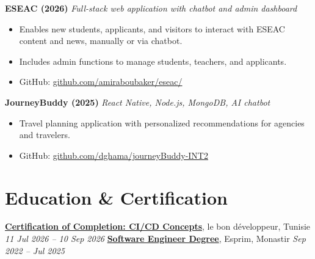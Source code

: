 \documentclass[10pt,a4paper]{article}
\begin{document}
\textbf{ESEAC (2026)} \hfill \textit{Full-stack web application with chatbot and admin dashboard}
\begin{itemize}
  \item Enables new students, applicants, and visitors to interact with ESEAC content and news, manually or via chatbot.
  \item Includes admin functions to manage students, teachers, and applicants.
  \item GitHub: \href{https://github.com/amiraboubaker/eseac/}{github.com/amiraboubaker/eseac/}
\end{itemize}

\textbf{JourneyBuddy (2025)} \hfill \textit{React Native, Node.js, MongoDB, AI chatbot}
\begin{itemize}
  \item Travel planning application with personalized recommendations for agencies and travelers.
  \item GitHub: \href{https://github.com/dghama/journeyBuddy-INT2}{github.com/dghama/journeyBuddy-INT2}
\end{itemize}

\section{Education \& Certification}

\textbf{\href{https://drive.google.com/file/d/1U2kx40WHIu4-3HNe4RP6boHpd5PJy3Gc/view?usp=drive_link}{Certification of Completion: CI/CD Concepts}}, le bon développeur, Tunisie \hfill \textit{11 Jul 2026 -- 10 Sep 2026}
\textbf{\href{https://drive.google.com/file/d/1mZem2Sf6ZC1jHSPO2iI6eAUIbm5OJKmc/view?usp=drive_link}{Software Engineer Degree}}, Esprim, Monastir \hfill \textit{Sep 2022 -- Jul 2025}
\end{document}

